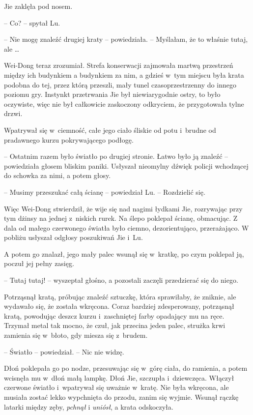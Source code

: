 \documentclass[oneside,polish,11pt,rmheadings]{mwbk}
\begin{document}
Jie zaklęła pod nosem.

-- Co? -- spytał Lu.

-- Nie mogę znaleźć drugiej kraty -- powiedziała. -- Myślałam, że to właśnie tutaj, ale \ldots 

Wei-Dong teraz zrozumiał. Strefa konserwacji zajmowała martwą przestrzeń między ich budynkiem a budynkiem za nim, a gdzieś w~tym miejscu była krata podobna do tej, przez którą przeszli, mały tunel czasoprzestrzenny do innego poziomu gry. Instynkt przetrwania Jie był niewiarygodnie ostry, to było oczywiste, więc nie był całkowicie zaskoczony odkryciem, że przygotowała tylne drzwi.

Wpatrywał się w~ciemność, całe jego ciało śliskie od potu i~brudne od pradawnego kurzu pokrywającego podłogę.

-- Ostatnim razem było światło po drugiej stronie. Łatwo było ją znaleźć -- powiedziała głosem bliskim paniki. Usłyszał nieomylny dźwięk policji wchodzącej do schowka za nimi, a potem głosy.

-- Musimy przeszukać całą ścianę -- powiedział Lu. -- Rozdzielić się. 

Więc Wei-Dong stwierdził, że wije się nad nagimi łydkami Jie, rozrywając przy tym dżinsy na jednej z~niskich rurek. Na ślepo poklepał ścianę, obmacując. Z dala od małego czerwonego światła było ciemno, dezorientująco, przerażająco. W pobliżu usłyszał odgłosy poszukiwań Jie i~Lu.

A potem go znalazł, jego mały palec wsunął się w~kratkę, po czym poklepał ją, poczuł jej pełny zasięg. 

-- Tutaj tutaj! -- wyszeptał głośno, a pozostali zaczęli przedzierać się do niego. 

Potrząsnął kratą, próbując znaleźć sztuczkę, która sprawiłaby, że zniknie, ale wydawało się, że została wkręcona. Coraz bardziej zdesperowany, potrząsnął kratą, powodując deszcz kurzu i~zaschniętej farby opadający mu na ręce. Trzymał metal tak mocno, że czuł, jak przecina jeden palec, strużka krwi zamienia się w~błoto, gdy miesza się z~brudem.

-- Światło -- powiedział. -- Nic nie widzę. 

Dłoń poklepała go po nodze, przesuwając się w~górę ciała, do ramienia, a potem wcisnęła mu w~dłoń małą lampkę. Dłoń Jie, szczupła i~dziewczęca. Włączył czerwone światło i~wpatrywał się uważnie w~kratę. Nie była wkręcona, ale musiała zostać lekko wypchnięta do przodu, zanim się wyjmie. Wsunął rączkę latarki między zęby, \textit{pchnął }i \textit{uniósł}, a krata odskoczyła.
\end{document}
